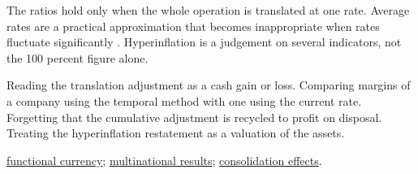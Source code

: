 \begin{qfmethod}
 The ratios hold only when the whole operation is translated at one rate. Average rates are a practical approximation that becomes inappropriate when rates fluctuate significantly \citep[para.~40]{eu-2023-1803-ias21}. Hyperinflation is a judgement on several indicators, not the 100 percent figure alone.

 Reading the translation adjustment as a cash gain or loss. Comparing margins of a company using the temporal method with one using the current rate. Forgetting that the cumulative adjustment is recycled to profit on disposal. Treating the hyperinflation restatement as a valuation of the assets.

 \hyperref[def:functional-currency-transactions]{functional currency}; \hyperref[meth:multinational-currency-tax-analysis]{multinational results}; \hyperref[meth:consolidation-ratio-effects]{consolidation effects}.

\end{qfmethod}

